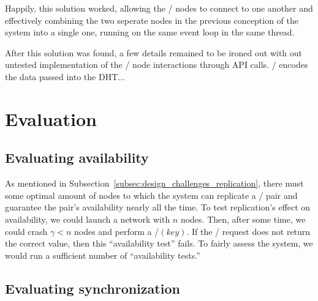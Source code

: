 \documentclass[11pt,twocolumn]{article}
\begin{document}
Happily, this solution worked, allowing the \Entangled/ nodes to connect to one another and effectively combining the two seperate nodes in the previous conception of the system into a single one, running on the same event loop in the same thread.

After this solution was found, a few details remained to be ironed out with out untested implementation of the \Entangled/ node interactions through API calls. \Entangled/ encodes the data passed into the DHT...






\section{Evaluation}
\label{sec:evaluation}

\subsection{Evaluating availability}
As mentioned in Subsection~\ref{subsec:design_challenges_replication}, there must some optimal amount of nodes to which the system can replicate a \kv/ pair and guarantee the pair's availability nearly all the time.
To test replication's effect on availability, we could launch a network with $n$ nodes.
Then, after some time, we could crash $\gamma < n$ nodes and perform a \findValue/$(key)$.
If the \findValue/ request does not return the correct value, then this ``availability test'' fails.
To fairly assess the system, we would run a sufficient number of ``availability tests.''

\subsection{Evaluating synchronization}










\end{document}
